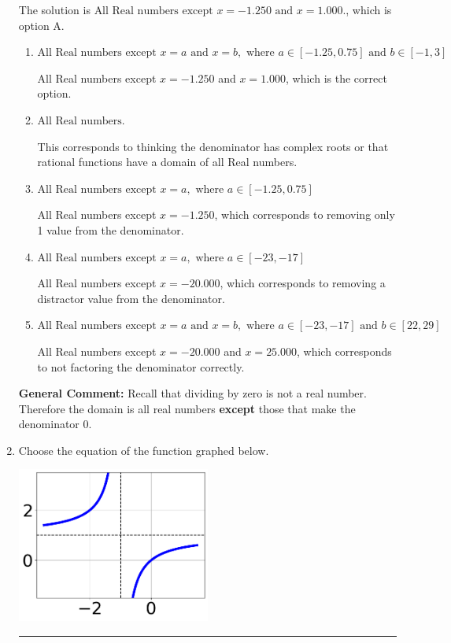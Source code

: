 \documentclass{extbook}[14pt]
\newcommand{\litem}[1]{\item #1

\rule{\textwidth}{0.4pt}}
\begin{document}
\begin{enumerate}
{The solution is \( \text{All Real numbers except } x = -1.250 \text{ and } x = 1.000. \), which is option A.\begin{enumerate}[label=\Alph*.]
\item \( \text{All Real numbers except } x = a \text{ and } x = b, \text{ where } a \in [-1.25, 0.75] \text{ and } b \in [-1, 3] \)

All Real numbers except $x = -1.250$ and $x = 1.000$, which is the correct option.
\item \( \text{All Real numbers.} \)

This corresponds to thinking the denominator has complex roots or that rational functions have a domain of all Real numbers.
\item \( \text{All Real numbers except } x = a, \text{ where } a \in [-1.25, 0.75] \)

All Real numbers except $x = -1.250$, which corresponds to removing only 1 value from the denominator.
\item \( \text{All Real numbers except } x = a, \text{ where } a \in [-23, -17] \)

All Real numbers except $x = -20.000$, which corresponds to removing a distractor value from the denominator.
\item \( \text{All Real numbers except } x = a \text{ and } x = b, \text{ where } a \in [-23, -17] \text{ and } b \in [22, 29] \)

All Real numbers except $x = -20.000$ and $x = 25.000$, which corresponds to not factoring the denominator correctly.
\end{enumerate}

\textbf{General Comment:} Recall that dividing by zero is not a real number. Therefore the domain is all real numbers \textbf{except} those that make the denominator 0.
}
\litem{
Choose the equation of the function graphed below.

\begin{center}
    \includegraphics[width=0.5\textwidth]{../Figures/rationalGraphToEquationCopyC.png}
\end{center}




}
\end{enumerate}
\end{document}
